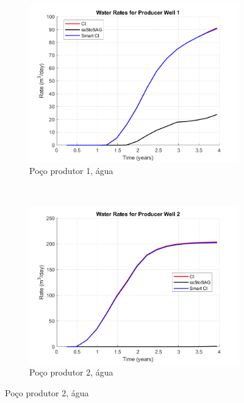 \begin{figure}[!ht]
	\centering
	\begin{subfigure}[b]{.45\textwidth}
		\includegraphics[width=\textwidth]{figs/resultadosEgg/imgsim1/EGG_WaterWell1_Zoom}
		\caption{Po\c{c}o produtor 1, \'{a}gua}
		\label{EGG1_WaterWell1}
	\end{subfigure}
	~
	\begin{subfigure}[b]{.45\textwidth}
		\includegraphics[width=\textwidth]{figs/resultadosEgg/imgsim1/EGG_WaterWell2_Zoom}
		\caption{Po\c{c}o produtor 2, \'{a}gua}
		\label{EGG1_WaterWell2}
	\end{subfigure}
	

\end{figure}
